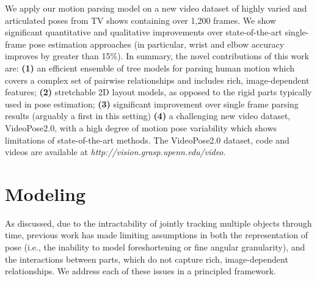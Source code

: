 
We apply our motion parsing model on a new video dataset of highly varied and 
articulated poses from TV shows containing over 1,200 frames.  We show 
significant quantitative and qualitative improvements over state-of-the-art 
single-frame pose estimation approaches (in particular, wrist and elbow 
accuracy improves by greater than 15\%).  In summary, the novel contributions 
of this work are: \textbf{(1)} an efficient ensemble of tree models for parsing 
human motion which covers a complex set of pairwise relationships and includes 
rich, image-dependent features; \textbf{(2)} stretchable 2D layout models, as 
opposed to the rigid parts typically used in pose estimation;
\textbf{(3)} significant improvement over single frame parsing results 
(arguably a first in this setting) \textbf{(4)} a challenging new video dataset, VideoPose2.0, 
with a high degree of motion pose variability which shows limitations of 
state-of-the-art methods.  The VideoPose2.0 dataset, code and videos are available at 
\textit{http://vision.grasp.upenn.edu/video}.



\section{Modeling}\label{sec:model}
As discussed, due to the intractability of jointly tracking multiple objects through time, previous 
work has made limiting assumptions in both the representation of pose (i.e., 
the inability to model foreshortening or fine angular granularity), and the 
interactions between parts, which do not capture rich, image-dependent 
relationships.  We address each of these issues in a principled framework.

